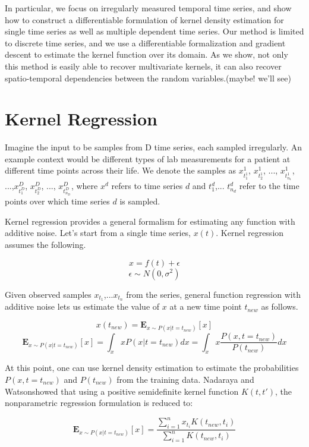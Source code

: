 \documentclass{article} %
\begin{document}
In particular, we focus on irregularly measured temporal time series, and show how to construct a differentiable formulation of kernel density estimation for single time series as well as multiple dependent time series. Our method is limited to discrete time series, and we use a differentiable formalization and gradient descent to estimate the kernel function over its domain. As we show, not only this method is easily able to recover multivariate kernels, it can also recover spatio-temporal dependencies between the random variables.(maybe! we'll see) 

\section{Kernel Regression}

Imagine the input to be samples from D time series, each sampled irregularly. An example context would be different types of lab measurements for a patient at different time points across their life. We denote the samples as ${x^1_{t^1_1}}$, ${x^1_{t^1_2}}$, ..., ${x^1_{t^1_{n_1}}}$, ...,${x^D_{t^D_1}}$, ${x^D_{t^D_2}}$, ..., ${x^D_{t^D_{n_D}}}$, where $x^d$ refers to time series $d$ and $t^d_1$,... $t^d_{n_d}$ refer to the time points over which time series $d$ is sampled. 

Kernel regression provides a general formalism for estimating any function with additive noise. Let's start from a single time series, $x(t)$. Kernel regression assumes the following.

$$ x = f(t) + \epsilon $$
$$\epsilon \sim N(0,\sigma^2)$$

Given observed samples $x_{t_1}$,...$x_{t_n}$ from the series, general function regression with additive noise lets us estimate the value of $x$ at a new time point $t_{new}$ as follows. 

$$x(t_{new}) = \mathbf{E}_{x \sim P(x|t=t_{new})}[x] $$
$$\mathbf{E}_{x \sim P(x|t=t_{new})}[x] = \int_x x P(x|t=t_{new}) dx =\int_x x \frac{P(x , t=t_{new})}{P(t_{new})} dx $$

At this point, one can use kernel density estimation to estimate the probabilities $P(x , t=t_{new})$ and $P(t_{new})$ from the training data. Nadaraya\cite{} and Watson\cite{}showed that using a positive semidefinite kernel function $K(t, t')$, the nonparametric regression formulation is reduced to:

$$\mathbf{E}_{x \sim P(x|t=t_{new})}[x] = \frac{\sum_{i=1}^n{x_{t_{i}}K(t_{new}, t_{i})}} {\sum_{i=1}^n{K(t_{new}, t_{i})}}$$
\end{document}

